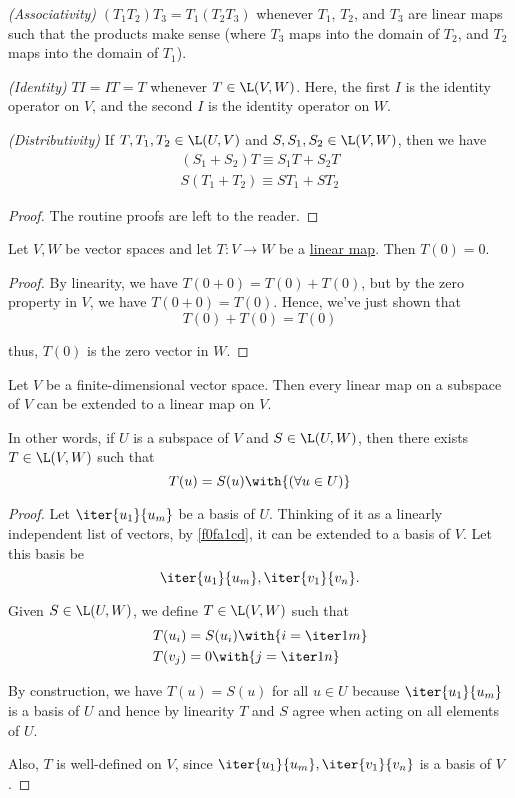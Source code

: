 \begin{enumerati}
  \item\textit{(Associativity)} $(T_1T_2)T_3=T_1(T_2T_3)$ whenever $T_1$, $T_2$,
  and $T_3$ are linear maps such that the products make sense (where $T_3$ maps
  into the domain of $T_2$, and $T_2$ maps into the domain of $T_1$).
  \item\textit{(Identity)} $TI=IT=T$ whenever $T\in\L(V,W)$. Here, the first $I$
  is the identity operator on $V$, and the second $I$ is the identity operator
  on $W$.
  \item\textit{(Distributivity)} If $T,T_1,T_2\in\L(U,V)$ and
  $S,S_1,S_2\in\L(V,W)$, then we have
  \begin{gather*}
    (S_1+S_2)T\equiv S_1T+S_2T \\
    S(T_1+T_2)\equiv ST_1+ST_2
  \end{gather*}
\end{enumerati}

\begin{proof}
  The routine proofs are left to the reader.
\end{proof}

\label{c5eb127}

Let $V,W$ be vector spaces and let $T:V\to W$ be a \href{d7d1925}{linear map}.
Then $T(0)=0$.

\begin{proof}
  By linearity, we have $T(0+0)=T(0)+T(0)$, but by the zero property in
  $V$, we have $T(0+0)=T(0)$. Hence, we've just shown that
  $$
    T(0)+T(0)=T(0)
  $$

  thus, $T(0)$ is the zero vector in $W$.
\end{proof}

\label{ebbd7cd}

Let $V$ be a finite-dimensional vector space. Then every linear map on a
subspace of $V$ can be extended to a linear map on $V$.

In other words, if $U$ is a subspace of $V$ and $S\in\L(U,W)$, then there
exists $T\in\L(V,W)$ such that
$$
  T(u)=S(u)\with{(\forall u\in U)}
$$

\begin{proof}
  Let $\iter{u_1}{u_m}$ be a basis of $U$. Thinking of it as a linearly
  independent list of vectors, by \autoref{f0fa1cd}, it can be extended to
  a basis of $V$. Let this basis be
  $$
    \iter{u_1}{u_m},\iter{v_1}{v_n}.
  $$

  Given $S\in\L(U,W)$, we define $T\in\L(V,W)$ such that
  \begin{align*}
    T(u_i) &=S(u_i)\with{i=\iter1m} \\
    T(v_j) &=0\with{j=\iter1n}
  \end{align*}

  By construction, we have $T(u)=S(u)$ for all $u\in U$ because
  $\iter{u_1}{u_m}$ is a basis of $U$ and hence by linearity $T$ and $S$ agree
  when acting on all elements of $U$.

  Also, $T$ is well-defined on $V$, since $\iter{u_1}{u_m},\iter{v_1}{v_n}$ is
  a basis of $V$.
\end{proof}
